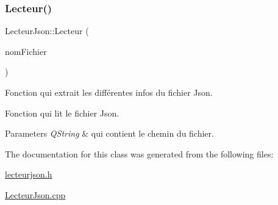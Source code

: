 \subsubsection{\texorpdfstring{Lecteur()}{Lecteur()}}
{\footnotesize\ttfamily Lecteur\+Json\+::\+Lecteur (\begin{DoxyParamCaption}\item[{Q\+String}]{nom\+Fichier }\end{DoxyParamCaption})}



Fonction qui extrait les différentes infos du fichier Json. 

Fonction qui lit le fichier Json.


\begin{DoxyParams}{Parameters}
{\em Q\+String} & qui contient le chemin du fichier. \\
\hline
\end{DoxyParams}


The documentation for this class was generated from the following files\+:\begin{DoxyCompactItemize}
\item 
\hyperlink{lecteurjson_8h}{lecteurjson.\+h}\item 
\hyperlink{_lecteur_json_8cpp}{Lecteur\+Json.\+cpp}\end{DoxyCompactItemize}
